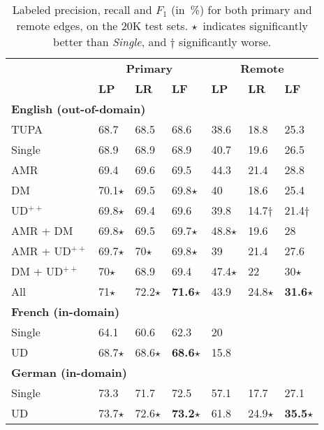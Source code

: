 \documentclass[11pt,a4paper]{article}
\begin{document}
\begin{table}[t]
\centering
\small
\setlength\tabcolsep{3pt}
\begin{tabular}{l|lll|lll}
& \multicolumn{3}{c|}{\footnotesize \bf Primary} & \multicolumn{3}{c}{\footnotesize \bf Remote} \\
& \footnotesize \textbf{LP} & \footnotesize \textbf{LR} & \footnotesize \textbf{LF}
& \footnotesize \textbf{LP} & \footnotesize \textbf{LR} & \footnotesize \textbf{LF} \\
\hline
\multicolumn{4}{l|}{\small \bf English (out-of-domain)} & \\
\footnotesize TUPA
& 68.7 & 68.5 & 68.6 & 38.6 & 18.8 & 25.3 \\
\footnotesize Single
& 68.9 & 68.9 & 68.9 & 40.7 & 19.6 & 26.5 \\
\cline{1-1}
\footnotesize AMR
& 69.4 & 69.6 & 69.5 & 44.3 & 21.4 & 28.8 \\
\footnotesize DM
& 70.1$\star$ & 69.5 & 69.8$\star$ & 40 & 18.6 & 25.4 \\
\footnotesize UD$^{++}$
& 69.8$\star$ & 69.4 & 69.6 & 39.8 & 14.7$\dagger$ & 21.4$\dagger$ \\
\footnotesize AMR + DM
& 69.8$\star$ & 69.5 & 69.7$\star$ & 48.8$\star$ & 19.6 & 28 \\
\footnotesize AMR + UD$^{++}$
& 69.7$\star$ & 70$\star$ & 69.8$\star$ & 39 & 21.4 & 27.6 \\
\footnotesize DM + UD$^{++}$
& 70$\star$ & 68.9 & 69.4 & 47.4$\star$ & 22 & 30$\star$ \\
\footnotesize All
& 71$\star$ & 72.2$\star$ & \textbf{71.6}$\star$ & 43.9 & 24.8$\star$ & \textbf{31.6}$\star$ \\
\hline
\multicolumn{4}{l|}{\small \bf French (in-domain)} & \\
\small Single & 64.1 & 60.6 & 62.3 & 20 & \enskip 5.7 & \enskip 8.8 \\
\small UD & 68.7$\star$ & 68.6$\star$ & \textbf{68.6}$\star$ & 15.8 & \enskip 5.7 & \enskip 8.3 \\
\hline
\multicolumn{4}{l|}{\small \bf German (in-domain)} & \\
\small Single & 73.3 & 71.7 & 72.5 & 57.1 & 17.7 & 27.1 \\
\small UD & 73.7$\star$ & 72.6$\star$ & \textbf{73.2}$\star$ & 61.8 & 24.9$\star$ & \textbf{35.5}$\star$
\end{tabular}
\caption{
Labeled precision, recall and $F_1$ (in~\%) for both primary and remote edges,
on the 20K test sets.
$\star$~indicates significantly better than \textit{Single},
and $\dagger$ significantly worse.}\label{tab:ood_results}
\end{table}
\end{document}
